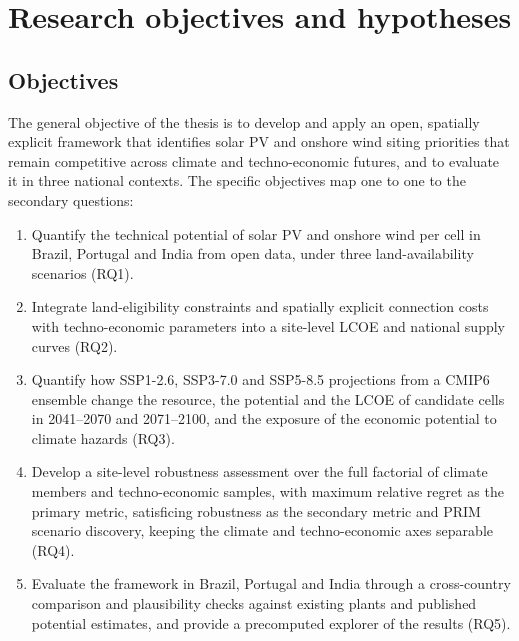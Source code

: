 \section{Research objectives and hypotheses}
\label{sec:objectives}

\subsection{Objectives}

The general objective of the thesis is to develop and apply an open, spatially explicit framework that identifies solar PV and onshore wind siting priorities that remain competitive across climate and techno-economic futures, and to evaluate it in three national contexts. The specific objectives map one to one to the secondary questions:

\begin{enumerate}
    \item[\textbf{RO1.}] Quantify the technical potential of solar PV and onshore wind per cell in Brazil, Portugal and India from open data, under three land-availability scenarios (RQ1).
    \item[\textbf{RO2.}] Integrate land-eligibility constraints and spatially explicit connection costs with techno-economic parameters into a site-level LCOE and national supply curves (RQ2).
    \item[\textbf{RO3.}] Quantify how SSP1-2.6, SSP3-7.0 and SSP5-8.5 projections from a CMIP6 ensemble change the resource, the potential and the LCOE of candidate cells in 2041--2070 and 2071--2100, and the exposure of the economic potential to climate hazards (RQ3).
    \item[\textbf{RO4.}] Develop a site-level robustness assessment over the full factorial of climate members and techno-economic samples, with maximum relative regret as the primary metric, satisficing robustness as the secondary metric and PRIM scenario discovery, keeping the climate and techno-economic axes separable (RQ4).
    \item[\textbf{RO5.}] Evaluate the framework in Brazil, Portugal and India through a cross-country comparison and plausibility checks against existing plants and published potential estimates, and provide a precomputed explorer of the results (RQ5).
\end{enumerate}


